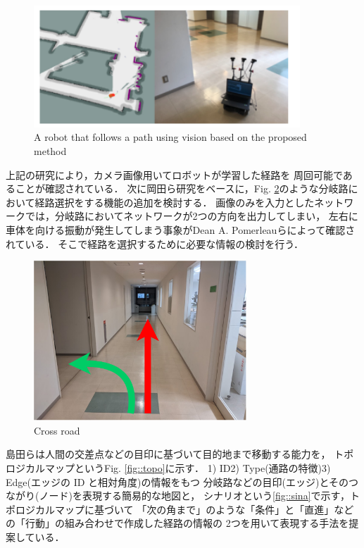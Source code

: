 \begin{figure}[h]
    \centering
    \includegraphics[width = 10cm]{./figs/okada.png}
    \caption{A robot that follows a path using vision based on the proposed method\cite{okada}}
    \label{fig::okada}
\end{figure}

\newpage
上記の研究により，カメラ画像用いてロボットが学習した経路を
周回可能であることが確認されている．
次に岡田ら\cite{okada}研究をベースに，Fig. \ref{fig::bunki}のような分岐路において経路選択をする機能の追加を検討する．
画像のみを入力としたネットワークでは，分岐路においてネットワークが2つの方向を出力してしまい，
左右に車体を向ける振動が発生してしまう事象がDean A. Pomerleauら\cite{pomeru}によって確認されている．
そこで経路を選択するために必要な情報の検討を行う．
 \vspace{4.0zh}
\begin{figure}[h]
    \centering
    \includegraphics[width = 8cm]{./figs/bunki.pdf}
    \caption{Cross road}
    \label{fig::bunki}
\end{figure}
\newpage
島田らは人間の交差点などの目印に基づいて目的地まで移動する能力を，
トポロジカルマップというFig. \ref{fig::topo}に示す．
1) ID2) Type(通路の特徴)3) Edge(エッジの ID と相対角度)の情報をもつ
分岐路などの目印(エッジ)とそのつながり(ノード)を表現する簡易的な地図と，
シナリオという\ref{fig::sina}で示す，トポロジカルマップに基づいて
「次の角まで」のような「条件」と「直進」などの「行動」の組み合わせで作成した経路の情報の
2つを用いて表現する手法を提案している．
